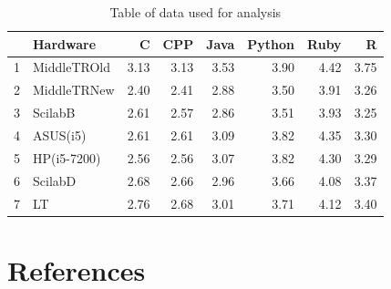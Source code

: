 \documentclass[12pt,halfline,a4paper,]{ouparticle}
\begin{document}
\begin{table}[ht]
\centering
\begin{tabular}{rlrrrrrr}
  \hline
 & Hardware & C & CPP & Java & Python & Ruby & R \\ 
  \hline
1 & MiddleTROld & 3.13 & 3.13 & 3.53 & 3.90 & 4.42 & 3.75 \\ 
  2 & MiddleTRNew & 2.40 & 2.41 & 2.88 & 3.50 & 3.91 & 3.26 \\ 
  3 & ScilabB & 2.61 & 2.57 & 2.86 & 3.51 & 3.93 & 3.25 \\ 
  4 & ASUS(i5) & 2.61 & 2.61 & 3.09 & 3.82 & 4.35 & 3.30 \\ 
  5 & HP(i5-7200) & 2.56 & 2.56 & 3.07 & 3.82 & 4.30 & 3.29 \\ 
  6 & ScilabD & 2.68 & 2.66 & 2.96 & 3.66 & 4.08 & 3.37 \\ 
  7 & LT & 2.76 & 2.68 & 3.01 & 3.71 & 4.12 & 3.40 \\ 
   \hline
\end{tabular}
\caption{Table of data used for analysis} 
\end{table}

\newpage

\hypertarget{references}{%
\section*{References}\label{references}}
\end{document}
